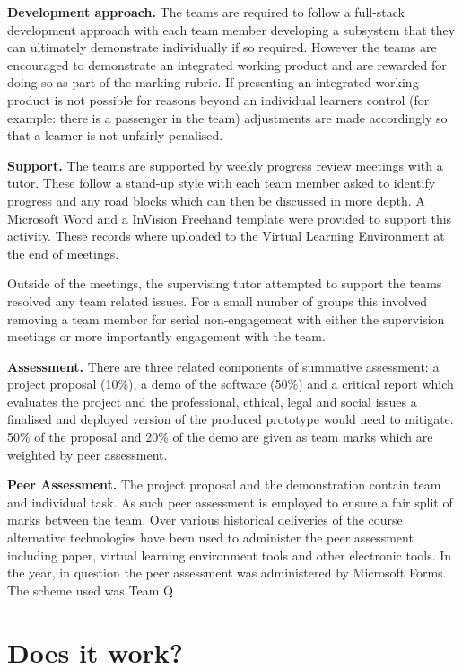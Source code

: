 \documentclass[sigconf, anonymous=true]{acmart}
\begin{document}
\textbf{Development approach.}
The teams are required to follow a full-stack development approach with each team member developing a subsystem that they can ultimately demonstrate individually if so required. However the teams are encouraged to demonstrate an integrated working product and are rewarded for doing so as part of the marking rubric. If presenting an integrated working product is not possible for reasons beyond an individual learners control (for example: there is a passenger in the team) adjustments are made accordingly so that a learner is not unfairly penalised.

\textbf{Support.}
The teams are supported by weekly progress review meetings with a tutor. These  follow a stand-up style with each team member asked to identify progress and any road blocks which can then be discussed in more depth. A Microsoft Word and a InVision Freehand \cite{InVision} template were provided to support this activity. These records where uploaded to the Virtual Learning Environment at the end of  meetings.

Outside of the meetings, the supervising tutor attempted to support the teams resolved any team related issues. For a small number of groups this involved removing a team member for serial non-engagement with either the supervision meetings or more importantly engagement with the team.

\textbf{Assessment.}
There are three related components of summative assessment: a project proposal (10\%), a demo of the software (50\%) and a critical report which evaluates the project and the professional, ethical, legal and social issues a finalised and deployed version of the produced prototype would need to mitigate. 50\% of the proposal and 20\% of the demo are given as team marks which are weighted by peer assessment.

\textbf{Peer Assessment.}
The project proposal and the demonstration contain team and individual task. As such peer assessment is employed to ensure a fair split of marks between the team. Over various historical deliveries of the course alternative technologies have been used to administer the peer assessment including paper, virtual learning environment tools and other electronic tools. In the year, in question the peer assessment was administered by Microsoft Forms. The scheme used was Team Q \cite{Britton2017}.


\section{Does it work?}	
\end{document}
